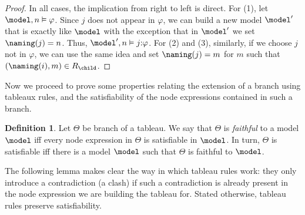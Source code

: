 \documentclass[10pt,a4paper]{amsart}
\newtheorem{lem}[thm]{Lemma}
\theoremstyle{definition}
\newtheorem{defi}[thm]{Definition}
\theoremstyle{remark}
\begin{document}
\begin{proof}
	In all cases, the implication from right to left is direct. 
	For (1), let $\model,n\vDash\varphi$. Since $j$ does not appear in $\varphi$, we can build a new model $\model'$ that is exactly like $\model$ with the exception that in $\model'$ we set $\naming(j)=n$. Thus, $\model',n\vDash j{:}\varphi$. 
	For (2) and (3), similarly, if we choose $j$ not in $\varphi$, we can use the same idea and set $\naming(j)=m$ for $m$ such that $(\naming(i),m) \in R_{\child}$. 
\end{proof}





Now we proceed to prove some properties relating the extension of a branch using tableaux rules, and the satisfiability of the node expressions contained in such a branch.

\begin{defi}
    \label{def:faithful}
    \label{def:branch-sat}
    Let $\Theta$ be branch of a tableau.
    We say that $\Theta$ is \emph{faithful} to a model $\model$ iff every node expression in $\Theta$ is satisfiable in $\model$.
    In turn, $\Theta$ is satisfiable iff there is a model $\model$ such that $\Theta$ is faithful to $\model$.
\end{defi}

The following lemma makes clear the way in which tableau rules work: they only introduce a contradiction (a clash) if such a contradiction is already present in the node expression we are building the tableau for.
Stated otherwise, tableau rules preserve satisfiability. 
\end{document}
